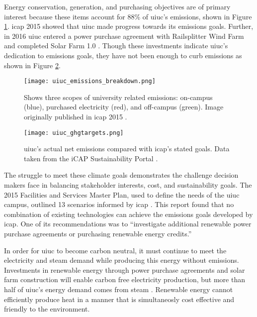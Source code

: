 Energy conservation, generation, and purchasing objectives are of primary
interest because these items account for 88\% of \gls{uiuc}'s emissions, shown
in Figure \ref{fig:uiuc_emissions_breakdown}. \gls{icap} 2015 showed that
\gls{uiuc} made progress towards its emissions goals. Further, in 2016
\gls{uiuc} entered a power purchase agreement with Railsplitter Wind Farm
\cite{breitweiser_wind_2016} and completed Solar Farm 1.0
\cite{white_solar_2017}. Though these investments indicate \gls{uiuc}'s dedication to
emissions goals, they have not been enough to curb emissions as shown in Figure
\ref{fig:uiuc_ghg}.

\begin{figure}[h]
  \centering
  \texttt{[image: uiuc\_emissions\_breakdown.png]}
  \caption{Shows three scopes of university related emissions: on-campus
  (blue), purchased electricity (red), and off-campus (green). Image originally
  published in \gls{icap} 2015 \cite{isee_illinois_2015}.}
  \label{fig:uiuc_emissions_breakdown}
\end{figure}

\begin{figure}[h]
  \centering
  \texttt{[image: uiuc\_ghgtargets.png]}
  \caption{\gls{uiuc}'s actual net emissions compared with \gls{icap}'s
  stated goals. Data taken from the iCAP Sustainability Portal
  \cite{noauthor_metric_nodate}.}
  \label{fig:uiuc_ghg}
\end{figure}

The struggle to meet these climate goals demonstrates the challenge decision
makers face in balancing stakeholder interests, cost, and sustainability goals.
The 2015 Facilities and Services Master Plan, used to define the needs of the
\gls{uiuc} campus, outlined 13 scenarios informed by \gls{icap}
\cite{affiliated_engineers_inc_utilities_2015}. This report found that no
combination of existing technologies can achieve the emissions goals developed
by \gls{icap}. One of its recommendations was to ``investigate additional
renewable power purchase agreements or purchasing renewable energy credits.''

In order for \gls{uiuc} to become carbon neutral, it must continue to meet the
electricity and steam demand while producing this energy without emissions.
Investments in renewable energy through power purchase agreements and solar
farm construction will enable carbon free electricity production, but more than
half of \gls{uiuc}'s energy demand comes from steam \cite{isee_illinois_2015}
. Renewable energy cannot
efficiently produce heat in a manner that is simultaneosly cost effective and
friendly to the environment.

